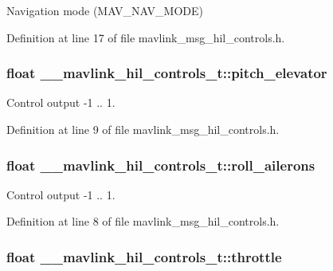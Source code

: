 Navigation mode (M\-A\-V\-\_\-\-N\-A\-V\-\_\-\-M\-O\-D\-E) 



Definition at line 17 of file mavlink\-\_\-msg\-\_\-hil\-\_\-controls.\-h.

\hypertarget{struct____mavlink__hil__controls__t_ae1da8c6e2be5e9927f9748671d901764}{
\subsubsection[{pitch\-\_\-elevator}]{\setlength{\rightskip}{0pt plus 5cm}float \-\_\-\-\_\-mavlink\-\_\-hil\-\_\-controls\-\_\-t\-::pitch\-\_\-elevator}}\label{struct____mavlink__hil__controls__t_ae1da8c6e2be5e9927f9748671d901764}


Control output -\/1 .. 1. 



Definition at line 9 of file mavlink\-\_\-msg\-\_\-hil\-\_\-controls.\-h.

\hypertarget{struct____mavlink__hil__controls__t_a65303ffed89e791c1551bf41d3d764dc}{
\subsubsection[{roll\-\_\-ailerons}]{\setlength{\rightskip}{0pt plus 5cm}float \-\_\-\-\_\-mavlink\-\_\-hil\-\_\-controls\-\_\-t\-::roll\-\_\-ailerons}}\label{struct____mavlink__hil__controls__t_a65303ffed89e791c1551bf41d3d764dc}


Control output -\/1 .. 1. 



Definition at line 8 of file mavlink\-\_\-msg\-\_\-hil\-\_\-controls.\-h.

\hypertarget{struct____mavlink__hil__controls__t_a9249963d6b4959b9cbc952ad86e2a2f1}{
\subsubsection[{throttle}]{\setlength{\rightskip}{0pt plus 5cm}float \-\_\-\-\_\-mavlink\-\_\-hil\-\_\-controls\-\_\-t\-::throttle}}\label{struct____mavlink__hil__controls__t_a9249963d6b4959b9cbc952ad86e2a2f1}


